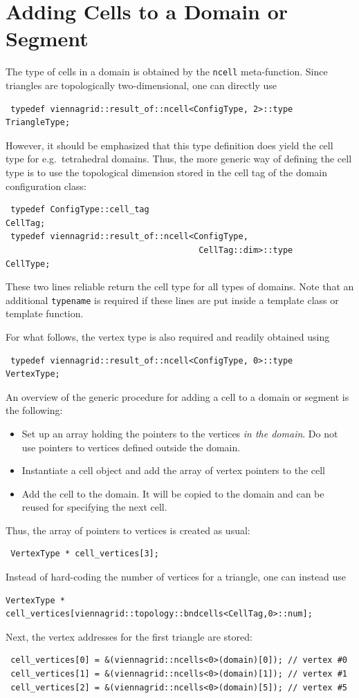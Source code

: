 \section{Adding Cells to a Domain or Segment}
The type of cells in a domain is obtained by the \lstinline|ncell| meta-function. Since triangles are topologically two-dimensional,
one can directly use
\begin{lstlisting}
 typedef viennagrid::result_of::ncell<ConfigType, 2>::type    TriangleType;
\end{lstlisting}
However, it should be emphasized that this type definition does yield the cell type for e.g.~tetrahedral domains.
Thus, the more generic way of defining the cell type is to use the topological dimension stored in the cell tag of the domain configuration class:
\begin{lstlisting}
 typedef ConfigType::cell_tag                                  CellTag;
 typedef viennagrid::result_of::ncell<ConfigType,
                                       CellTag::dim>::type     CellType;
\end{lstlisting}
These two lines reliable return the cell type for all types of domains. Note that an additional \lstinline|typename| is required if these lines are put inside a template class or template function.

For what follows, the vertex type is also required and readily obtained using
\begin{lstlisting}
 typedef viennagrid::result_of::ncell<ConfigType, 0>::type     VertexType;
\end{lstlisting}

An overview of the generic procedure for adding a cell to a domain or segment is the following:
  \begin{itemize}
   \item Set up an array holding the pointers to the vertices \emph{in the domain}. Do not use pointers to vertices defined outside the domain.
   \item Instantiate a cell object and add the array of vertex pointers to the cell
   \item Add the cell to the domain. It will be copied to the domain and can be reused for specifying the next cell.
  \end{itemize}
Thus, the array of pointers to vertices is created as usual:
\begin{lstlisting}
 VertexType * cell_vertices[3];
\end{lstlisting}
Instead of hard-coding the number of vertices for a triangle, one can instead use 
\begin{lstlisting}
VertexType * cell_vertices[viennagrid::topology::bndcells<CellTag,0>::num];
\end{lstlisting}
Next, the vertex addresses for the first triangle are stored:
\begin{lstlisting}
 cell_vertices[0] = &(viennagrid::ncells<0>(domain)[0]); // vertex #0
 cell_vertices[1] = &(viennagrid::ncells<0>(domain)[1]); // vertex #1
 cell_vertices[2] = &(viennagrid::ncells<0>(domain)[5]); // vertex #5
\end{lstlisting}

